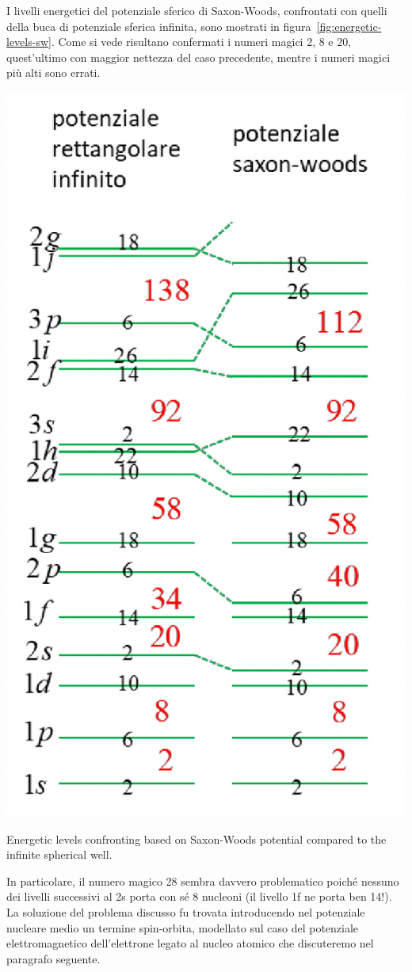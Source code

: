 I livelli energetici del potenziale sferico
di Saxon-Woods, confrontati con quelli
della buca di potenziale sferica infinita,
sono mostrati in figura~\ref{fig:energetic-levels-sw}. Come
si vede risultano confermati i numeri
magici 2, 8 e 20, quest’ultimo con
maggior nettezza del caso precedente,
mentre i numeri magici più alti sono
errati.
\begin{marginfigure}
	\includegraphics{figs/energetic-levels-sw}
	\caption{Energetic levels confronting based on Saxon-Woods potential compared to the infinite spherical well.}
	\label{fig:energetic-levels-sw}
\end{marginfigure}
In particolare, il numero magico
28 sembra davvero problematico
poiché nessuno dei livelli successivi al
2s porta con sé 8 nucleoni (il livello 1f ne porta ben 14!).
La soluzione del problema discusso fu trovata introducendo nel potenziale nucleare medio un termine spin-orbita,
modellato sul caso del potenziale elettromagnetico dell’elettrone legato al nucleo atomico che discuteremo nel paragrafo seguente.


